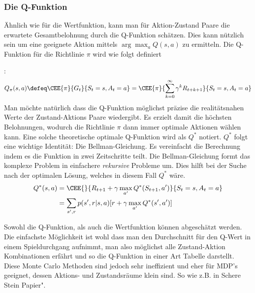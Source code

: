 \documentclass[a4paper,titlepage]{article}
\numberwithin{equation}{section} %
\begin{document}
\subsubsection{Die Q-Funktion} \label{section:q-funktion}
Ähnlich wie für die Wertfunktion, kann man für Aktion-Zustand Paare die erwartete Gesamtbelohnung durch die Q-Funktion schätzen. Dies kann nützlich sein um eine geeignete Aktion mittels $\arg\max_{a}Q(s,a)$ zu ermitteln. Die Q-Funktion für die Richtlinie $\pi$ wird wie folgt definiert{\cite{watkinsQlearning1992}:
\begin{equation} \label{eqn:q_definition}
	Q_\pi(s,a) \defeq \CEE{\pi}{G_t}{S_t=s, A_t=a} = \CEE{\pi}{\sum_{k=0}^{\infty}\gamma^{k}R_{t+k+1}}{S_t=s, A_t=a}
\end{equation}
Man möchte natürlich dass die Q-Funktion möglichst präzise die realitätsnahen Werte der Zustand-Aktions Paare wiedergibt. Es erzielt damit die höchsten Belohnungen, wodurch die Richtlinie $\pi$ dann immer optimale Aktionen wählen kann. Eine solche theoretische optimale Q-Funktion wird als $Q^*$ notiert. $Q^*$ folgt eine wichtige Identität: Die Bellman-Gleichung. Es vereinfacht die Berechnung indem es die Funktion in zwei Zeitschritte teilt. Die Bellman-Gleichung formt das komplexe Problem in einfachere \emph{rekursive} Probleme um. Dies hilft bei der Suche nach der optimalen Lösung, welches in diesem Fall $Q^*$ wäre.
\begin{align} \label{eqn:bellman-eq}
	Q^*(s,a) &= \CEE{}{R_{t+1} + \gamma \max_{a'}Q^*(S_{t+1}, a')}{S_t=s, A_t=a} \\
			 &= \sum_{s', r}p(s', r | s, a)[r + \gamma \max_{a'}Q^*(s', a')]
\end{align}


Sowohl die Q-Funktion, als auch die Wertfunktion können abgeschätzt werden. Die einfachste Möglichkeit ist wohl dass man den Durchschnitt für den Q-Wert in einem Spieldurchgang aufnimmt, man also möglichst alle Zustand-Aktion Kombinationen erfährt und so die Q-Funktion in einer Art Tabelle darstellt. Diese Monte Carlo Methoden sind jedoch sehr ineffizient und eher für MDP's geeignet, dessen Aktions- und Zustandsräume klein sind. So wie z.B. in Schere Stein Papier"\cite{Wang2020}.


}
\end{document}

